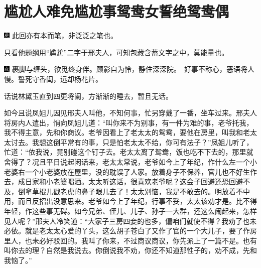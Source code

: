 

\chapter{尴尬人难免尴尬事\hspace{.5em}鸳鸯女誓绝鸳鸯偶}

{\includegraphics[width=3mm]{../Images/00004}  \kaishu 此回亦有本而笔，非泛泛之笔也。}

{只看他题纲用“尴尬”二字于邢夫人，可知包藏含蓄文字之中，莫能量也。}

{\includegraphics[width=3mm]{../Images/00005}  \kaishu 裹脚与缠头，欲觅终身伴。顾影自为怜，静住深深院。　好事不称心，恶语将人慢。誓死守香闺，远却杨花片。}

话说林黛玉直到四更将阑，方渐渐的睡去，暂且无话。

如今且说凤姐儿因见邢夫人叫他，不知何事，忙另穿戴了一番，坐车过来。邢夫人将房内人遣出，悄向凤姐儿道：“叫你来不为别事，有一件为难的事，老爷托我，我不得主意，先和你商议。老爷因看上了老太太的鸳鸯，要他在房里，叫我和老太太讨去。我想这倒平常有的事，只是怕老太太不给，你可有法子？”凤姐儿听了，忙道：“依我说，竟别碰这个钉子去。老太太离了鸳鸯，饭也吃不下去的，那里就舍得了？况且平日说起闲话来，老太太常说，老爷如今上了年纪，作什么左一个小老婆右一个小老婆放在屋里，没的耽误了人家。放着身子不保养，官儿也不好生作去，成日家和小老婆喝酒。太太听这话，很喜欢老爷呢？这会子回避还恐回避不及，倒拿草棍儿戳老虎的鼻子眼儿去了！太太别恼，我是不敢去的。明放着不中用，而且反招出没意思来。老爷如今上了年纪，行事不妥，太太该劝才是。比不得年轻，作这些事无碍。如今兄弟、侄儿、儿子、孙子一大群，还这么闹起来，怎样见人呢？”邢夫人冷笑道：“大家子三房四妾的也多，偏咱们就使不得？我劝了也未必依。就是老太太心爱的丫头，这么胡子苍白了又作了官的一个大儿子，要了作房里人，也未必好驳回的。我叫了你来，不过商议商议，你先派上了一篇不是。也有叫你去的理？自然是我说去。你倒说我不劝，你还不知道那性子的，劝不成，先和我恼了。”

